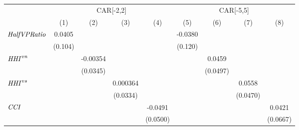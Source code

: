 {
\def\sym#1{\ifmmode^{#1}\else\(^{#1}\)\fi}
\begin{tabular}{l*{8}{c}}
\toprule
                    &\multicolumn{4}{c}{CAR[-2,2]}                                                          &\multicolumn{4}{c}{CAR[-5,5]}                                                          \\\cmidrule(lr){2-5}\cmidrule(lr){6-9}
                    &\multicolumn{1}{c}{(1)}         &\multicolumn{1}{c}{(2)}         &\multicolumn{1}{c}{(3)}         &\multicolumn{1}{c}{(4)}         &\multicolumn{1}{c}{(5)}         &\multicolumn{1}{c}{(6)}         &\multicolumn{1}{c}{(7)}         &\multicolumn{1}{c}{(8)}         \\
\midrule
${\it Half VP Ratio}$&      0.0405         &                     &                     &                     &     -0.0380         &                     &                     &                     \\
                    &     (0.104)         &                     &                     &                     &     (0.120)         &                     &                     &                     \\
${\it HHI}^{vn}$    &                     &    -0.00354         &                     &                     &                     &      0.0459         &                     &                     \\
                    &                     &    (0.0345)         &                     &                     &                     &    (0.0497)         &                     &                     \\
${\it HHI}^{vs}$    &                     &                     &    0.000364         &                     &                     &                     &      0.0558         &                     \\
                    &                     &                     &    (0.0334)         &                     &                     &                     &    (0.0470)         &                     \\
${\it CCI}$         &                     &                     &                     &     -0.0491         &                     &                     &                     &      0.0421         \\
                    &                     &                     &                     &    (0.0500)         &                     &                     &                     &    (0.0667)         \\

\end{tabular}}
